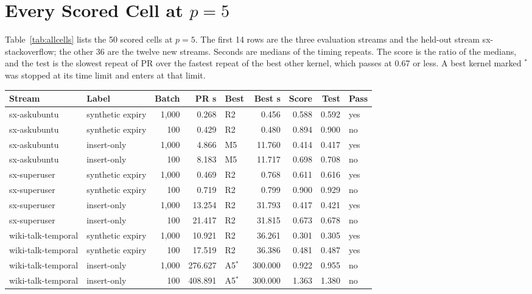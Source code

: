 \section{Every Scored Cell at $p = 5$}
\label{app:cells}
Table~\ref{tab:allcells} lists the 50 scored cells at $p = 5$. The first 14 rows are the three evaluation streams and the held-out stream sx-stackoverflow; the other 36 are the twelve new streams. Seconds are medians of the timing repeats. The score is the ratio of the medians, and the test is the slowest repeat of PR over the fastest repeat of the best other kernel, which passes at 0.67 or less. A best kernel marked $^*$ was stopped at its time limit and enters at that limit.
\begin{table}[p]
\centering
\footnotesize
\setlength{\tabcolsep}{3pt}
\begin{tabular}{llrrlrrrl}
\hline
Stream & Label & Batch & PR s & Best & Best s & Score & Test & Pass \\
\hline
sx-askubuntu & synthetic expiry & 1,000 & 0.268 & R2 & 0.456 & 0.588 & 0.592 & yes \\
sx-askubuntu & synthetic expiry & 100 & 0.429 & R2 & 0.480 & 0.894 & 0.900 & no \\
sx-askubuntu & insert-only & 1,000 & 4.866 & M5 & 11.760 & 0.414 & 0.417 & yes \\
sx-askubuntu & insert-only & 100 & 8.183 & M5 & 11.717 & 0.698 & 0.708 & no \\
sx-superuser & synthetic expiry & 1,000 & 0.469 & R2 & 0.768 & 0.611 & 0.616 & yes \\
sx-superuser & synthetic expiry & 100 & 0.719 & R2 & 0.799 & 0.900 & 0.929 & no \\
sx-superuser & insert-only & 1,000 & 13.254 & R2 & 31.793 & 0.417 & 0.421 & yes \\
sx-superuser & insert-only & 100 & 21.417 & R2 & 31.815 & 0.673 & 0.678 & no \\
wiki-talk-temporal & synthetic expiry & 1,000 & 10.921 & R2 & 36.261 & 0.301 & 0.305 & yes \\
wiki-talk-temporal & synthetic expiry & 100 & 17.519 & R2 & 36.386 & 0.481 & 0.487 & yes \\
wiki-talk-temporal & insert-only & 1,000 & 276.627 & A5$^*$ & 300.000 & 0.922 & 0.955 & no \\
wiki-talk-temporal & insert-only & 100 & 408.891 & A5$^*$ & 300.000 & 1.363 & 1.380 & no \\

\end{tabular}
\end{table}
